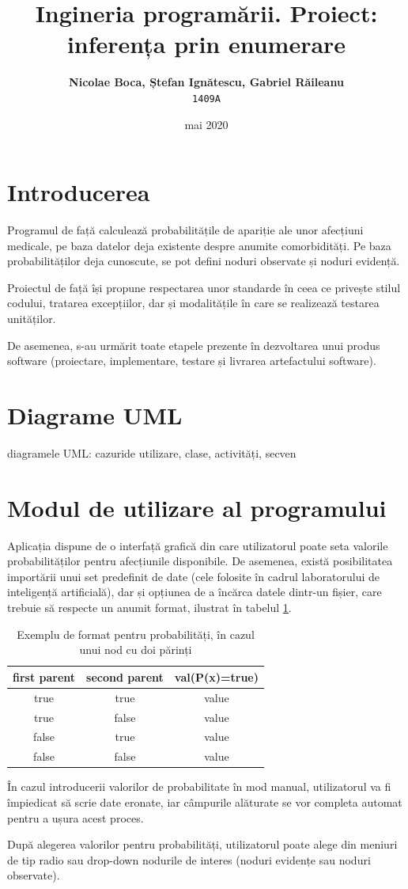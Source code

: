 \documentclass[12pt]{article}
\title{Ingineria programării. Proiect: inferența prin enumerare} %
\author{\textbf{Nicolae Boca, Ștefan Ignătescu, Gabriel Răileanu}\\ \texttt{1409A}}
\date{mai 2020}
\begin{document}
\maketitle %

\section{Introducerea}
Programul de față calculează probabilitățile de apariție ale unor afecțiuni medicale, pe baza datelor deja existente despre anumite comorbidități. Pe baza probabilităților deja cunoscute, se pot defini noduri observate și noduri evidență.
\par
Proiectul de față își propune respectarea unor standarde în ceea ce privește stilul codului, tratarea excepțiilor, dar și modalitățile în care se realizează testarea unităților.
\par
De asemenea, s-au urmărit toate etapele prezente în dezvoltarea unui produs software (proiectare, implementare, testare și livrarea artefactului software).
\section{Diagrame UML}
diagramele UML: cazuride utilizare, clase, activități, secven
\section{Modul de utilizare al programului}
Aplicația dispune de o interfață grafică din care utilizatorul poate seta valorile probabilităților pentru afecțiunile disponibile. De asemenea, există posibilitatea importării unui set predefinit de date (cele folosite în cadrul laboratorului de inteligență artificială), dar și opțiunea de a încărca datele dintr-un fișier, care trebuie să respecte un anumit format, ilustrat în tabelul \ref{probabilitiesFileFormatTable}.

\begin{table}[h!]
	\begin{center}
	\caption{Exemplu de format pentru probabilități, în cazul unui nod cu doi părinți}
	\label{probabilitiesFileFormatTable}
\begin{tabular}{c|c|c}
	\hline
	\textbf{first parent}&\textbf{second parent} &\textbf{val(P(x)=true)}
	\\ \hline
	true & true & value \\
	true & false & value \\
	false & true & value \\
	false & false & value \\
	\hline
\end{tabular}
\end{center}
\end{table}
În cazul introducerii valorilor de probabilitate în mod manual, utilizatorul va fi împiedicat să scrie date eronate, iar câmpurile alăturate se vor completa automat pentru a ușura acest proces.
\par
După alegerea valorilor pentru probabilități, utilizatorul poate alege din meniuri de tip radio sau drop-down nodurile de interes (noduri evidențe sau noduri observate).
\end{document}
